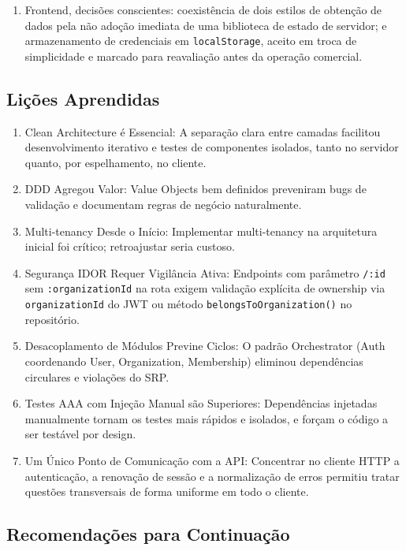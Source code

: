 \documentclass[12pt,openright,oneside,a4paper]{article}
\begin{document}
\begin{enumerate}
\item Frontend, decisões conscientes: coexistência de dois estilos de obtenção de dados pela não adoção imediata de uma biblioteca de estado de servidor; e armazenamento de credenciais em \texttt{localStorage}, aceito em troca de simplicidade e marcado para reavaliação antes da operação comercial.
\end{enumerate}

\subsection{Lições Aprendidas}

\begin{enumerate}
\item Clean Architecture é Essencial: A separação clara entre camadas facilitou desenvolvimento iterativo e testes de componentes isolados, tanto no servidor quanto, por espelhamento, no cliente.
\item DDD Agregou Valor: Value Objects bem definidos preveniram bugs de validação e documentam regras de negócio naturalmente.
\item Multi-tenancy Desde o Início: Implementar multi-tenancy na arquitetura inicial foi crítico; retroajustar seria custoso.
\item Segurança IDOR Requer Vigilância Ativa: Endpoints com parâmetro \texttt{/:id} sem \texttt{:organizationId} na rota exigem validação explícita de ownership via \texttt{organizationId} do JWT ou método \texttt{belongsToOrganization()} no repositório.
\item Desacoplamento de Módulos Previne Ciclos: O padrão Orchestrator (Auth coordenando User, Organization, Membership) eliminou dependências circulares e violações do SRP.
\item Testes AAA com Injeção Manual são Superiores: Dependências injetadas manualmente tornam os testes mais rápidos e isolados, e forçam o código a ser testável por design.
\item Um Único Ponto de Comunicação com a API: Concentrar no cliente HTTP a autenticação, a renovação de sessão e a normalização de erros permitiu tratar questões transversais de forma uniforme em todo o cliente.
\end{enumerate}

\subsection{Recomendações para Continuação}
\end{document}

